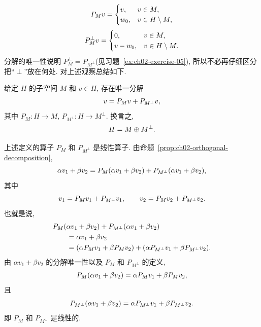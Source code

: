 \setcounter{equation}{2}
\begin{equation}
\MathBookFormulaID{formula-ch02-pm-definition}
P_Mv=\begin{cases}
v,&v\in M,\\
w_0,&v\in H\setminus M,
\end{cases}
\label{eq:ch02-pm-definition}
\end{equation}
\setcounter{equation}{3}
\begin{equation}
\MathBookFormulaID{formula-ch02-pm-perp-definition}
P_M^\perp v=\begin{cases}
0,&v\in M,\\
v-w_0,&v\in H\setminus M.
\end{cases}
\label{eq:ch02-pm-perp-definition}
\end{equation}
分解的唯一性说明 $P_M^\perp=P_{M^\perp}$(见习题~\ref{ex:ch02-exercise-05}), 所以不必再仔细区分把``$\perp$''放在何处. 对上述观察总结如下.

\setcounter{thmcount}{4}
\begin{Proposition}
\label{prop:ch02-orthogonal-decomposition}
给定 $H$ 的子空间 $M$ 和 $v\in H$, 存在唯一分解
\setcounter{equation}{5}
\begin{equation}
\MathBookFormulaID{formula-ch02-orthogonal-decomposition}
v=P_Mv+P_{M^\perp}v,
\label{eq:ch02-orthogonal-decomposition}
\end{equation}
其中 $P_M:H\longrightarrow M$, $P_{M^\perp}:H\longrightarrow M^\perp$. 换言之,
\begin{equation}
\MathBookFormulaID{formula-ch02-hilbert-direct-sum}
H=M\oplus M^\perp.
\label{eq:ch02-hilbert-direct-sum}
\end{equation}
\end{Proposition}

\setcounter{thmcount}{7}
\begin{Remark}
\label{rem:ch02-projections-linear}
上述定义的算子 $P_M$ 和 $P_{M^\perp}$ 是线性算子. 由命题~\ref{prop:ch02-orthogonal-decomposition},
\[
\MathBookFormulaID{formula-ch02-linear-projection-decomposition}
\alpha v_1+\beta v_2
=P_M(\alpha v_1+\beta v_2)+P_{M^\perp}(\alpha v_1+\beta v_2),
\]
其中
\[
\MathBookFormulaID{formula-ch02-v-one-v-two-decompositions}
v_1=P_Mv_1+P_{M^\perp}v_1,
\qquad
v_2=P_Mv_2+P_{M^\perp}v_2.
\]
也就是说,
\[
\MathBookFormulaID{formula-ch02-linearity-comparison}
\begin{aligned}
&P_M(\alpha v_1+\beta v_2)+P_{M^\perp}(\alpha v_1+\beta v_2)\\
&\qquad=\alpha v_1+\beta v_2\\
&\qquad=(\alpha P_Mv_1+\beta P_Mv_2)
+(\alpha P_{M^\perp}v_1+\beta P_{M^\perp}v_2).
\end{aligned}
\]
由 $\alpha v_1+\beta v_2$ 的分解唯一性以及 $P_M$ 和 $P_{M^\perp}$ 的定义,
\[
\MathBookFormulaID{formula-ch02-pm-linearity}
P_M(\alpha v_1+\beta v_2)=\alpha P_Mv_1+\beta P_Mv_2,
\]
且
\[
\MathBookFormulaID{formula-ch02-pm-perp-linearity}
P_{M^\perp}(\alpha v_1+\beta v_2)
=\alpha P_{M^\perp}v_1+\beta P_{M^\perp}v_2.
\]
即 $P_M$ 和 $P_{M^\perp}$ 是线性的.
\end{Remark}

